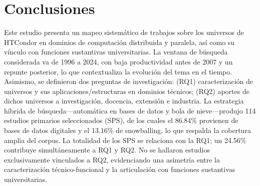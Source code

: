 \section{Conclusiones}\label{sec:conclusiones}
Este estudio presenta un mapeo sistemático de trabajos sobre los universos de HTCondor en dominios de computación distribuida y paralela, así como su vínculo con funciones sustantivas universitarias. La ventana de búsqueda considerada va de 1996 a 2024, con baja productividad antes de 2007 y un repunte posterior, lo que contextualiza la evolución del tema en el tiempo. 
Asimismo, se definieron dos preguntas de investigación: (RQ1) caracterización de universos y sus aplicaciones/estructuras en dominios técnicos; (RQ2) aportes de dichos universos a investigación, docencia, extensión e industria. 
La estrategia híbrida de búsqueda—automática en bases de datos y bola de nieve—produjo 114 estudios primarios seleccionados (SPS), de los cuales el 86.84\% provienen de bases de datos digitales y el 13.16\% de snowballing, lo que respalda la cobertura amplia del corpus. 
La totalidad de los SPS se relaciona con la RQ1; un 24.56\% contribuye simultáneamente a RQ1 y RQ2. No se hallaron estudios exclusivamente vinculados a RQ2, evidenciando una asimetría entre la caracterización técnico-funcional y la articulación con funciones sustantivas universitarias.

